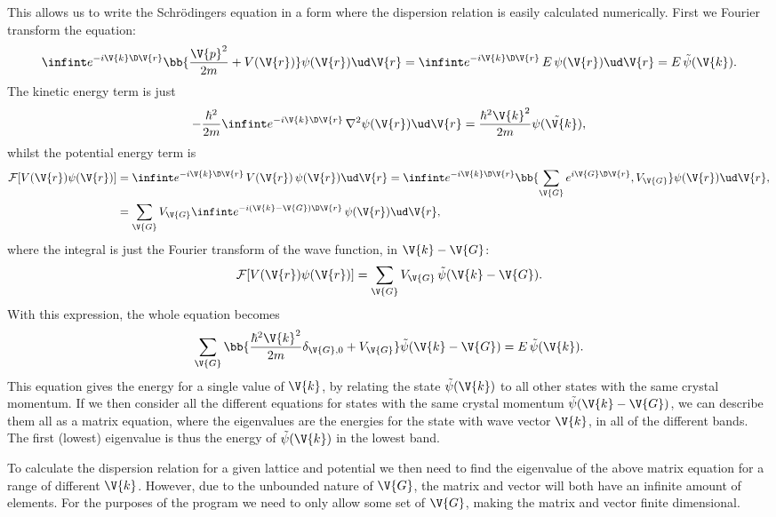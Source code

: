 \documentclass[main.tex]{subfiles}
\begin{document}
	
	This allows us to write the Schrödingers equation in a form where the dispersion relation is easily calculated numerically. First we Fourier transform the equation:
	\begin{equation}
		\infint e^{-i \V{k} \D \V{r}} \bb{\frac{\V{p}^2}{2m} + V(\V{r})}\psi(\V{r}) \ud \V{r}= \infint e^{-i\V{k} \D \V{r}}\, E\, \psi(\V{r}) \ud \V{r} = E \,\tilde{\psi}(\V{k}).
	\end{equation}
	The kinetic energy term is just
	\begin{equation}
		-\frac{\hbar^2}{2m}\infint e^{-i \V{k} \D \V{r}}\, \nabla^2\psi(\V{r}) \ud \V{r} = \frac{\hbar^2 \V{k}^2}{2m}\tilde{\psi(\V{k})},
	\end{equation}
	whilst the potential energy term is
	\begin{align}
		\mathcal{F}[V(\V{r}) \psi(\V{r})] &= \infint e^{-i \V{k} \D \V{r}}\, V(\V{r})\, \psi(\V{r}) \ud \V{r} = \infint e^{-i \V{k}\D \V{r}} \bb{\sum_{\V{G}} e^{i \V{G} \D \V{r}}, V_{\V{G}} }\psi (\V{r}) \ud \V{r}, \\
		&= \sum_{\V{G}} V_{\V{G}} \infint e^{-i(\V{k}-\V{G})\D \V{r}}\, \psi(\V{r}) \ud \V{r},
	\end{align}
	where the integral is just the Fourier transform of the wave function, in $ \V{k}-\V{G} $:
	\begin{equation}
		\mathcal{F}[V(\V{r}) \psi(\V{r})] = \sum_{\V{G}} V_{\V{G}} \, \tilde{\psi}(\V{k}-\V{G}).
	\end{equation}
	With this expression, the whole equation becomes
	\begin{equation}
		\sum_{\V{G}} \bb{\frac{\hbar^2 \V{k}^2}{2m} \delta_{\V{G},0} + V_{\V{G}} } \tilde{\psi}(\V{k}-\V{G}) = E\, \tilde{\psi}(\V{k}).
	\end{equation}
	This equation gives the energy for a single value of $ \V{k} $, by relating the state $ \tilde{\psi}(\V{k}) $ to all other states with the same crystal momentum. If we then consider all the different equations for states with the same crystal momentum $ \tilde{\psi} (\V{k}-\V{G}) $, we can describe them all as a matrix equation, where the eigenvalues are the energies for the state with wave vector $ \V{k} $, in all of the different bands. The first (lowest) eigenvalue is thus the energy of $ \tilde{\psi} (\V{k}) $ in the lowest band.
	
	To calculate the dispersion relation for a given lattice and potential we then need to find the eigenvalue of the above matrix equation for a range of different $ \V{k} $. However, due to the unbounded nature of $ \V{G} $, the matrix and vector will both have an infinite amount of elements. For the purposes of the program we need to only allow some set of $ \V{G} $, making the matrix and vector finite dimensional.
	
\end{document}
